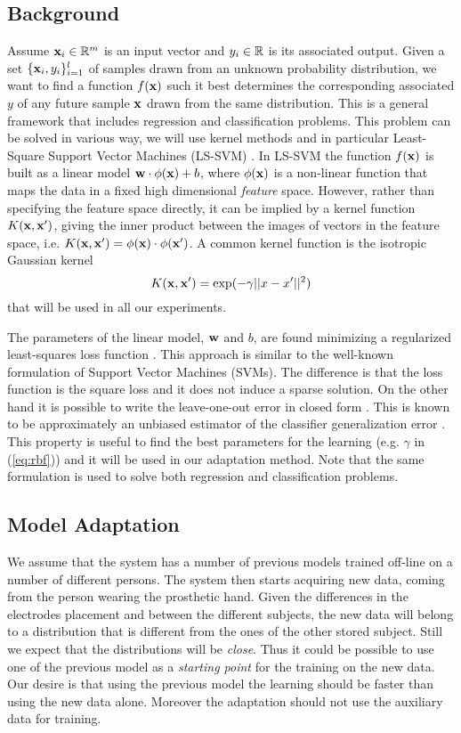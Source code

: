 \subsection{Background}

Assume $\mathbf{x}_i \in \mathbb{R}^m$ is an input vector and $y_i \in \mathbb{R}$ is its associated output.
Given a set $\{\mathbf{x}_i,y_i\}_{i=1}^l$ of samples drawn from an unknown probability
distribution, we want to find a function $f(\mathbf{x})$ such it
best determines the corresponding associated $y$ of any future sample $\mathbf{x}$
drawn from the same distribution.
This is a general framework that includes regression and classification problems.
This problem can be solved in various way, we will use kernel methods and in
particular Least-Square Support Vector Machines (LS-SVM) \cite{Cristianini00}.
In LS-SVM the function $f(\mathbf{x})$ is built as a linear model
$\mathbf{w} \cdot \phi(\mathbf{x}) + b$, where $\phi(\mathbf{x})$ is a non-linear function that maps
the data in a fixed high dimensional \emph{feature} space.
However, rather than specifying the feature space directly,
it can be implied by a kernel function $K(\mathbf{x},\mathbf{x}')$, giving the
inner product between the images of vectors in the feature
space, i.e. $K(\mathbf{x},\mathbf{x}')=\phi(\mathbf{x}) \cdot \phi(\mathbf{x}')$.
A common kernel function is the isotropic Gaussian kernel
\begin{equation}
	K(\xx,\xx')=\exp(-\gamma ||x-x'||^2)
	\label{eq:rbf}
\end{equation}
that will be used in all our experiments.

The parameters of the linear model, $\mathbf{w}$ and $b$, are found minimizing a
regularized least-squares loss function \cite{Cristianini00}.
This approach is similar to the well-known formulation of Support Vector
Machines (SVMs). The difference is that the loss function is the square loss and it
does not induce a sparse solution. On the other hand it is possible to write
the leave-one-out error in closed form \cite{Rifkin07}. This is known to be
approximately an unbiased estimator of the classifier generalization error
\cite{LuntzB69}. This property is useful to find the best parameters for the
learning (e.g. $\gamma$ in (\ref{eq:rbf})) and it will be used in our
adaptation method. Note that the same formulation is used to solve both
regression and classification problems.

\subsection{Model Adaptation}

We assume that the system has a number of previous models trained off-line on a
number of different persons. The system then starts acquiring new data, coming
from the person wearing the prosthetic hand. Given the differences in the
electrodes placement and between the different subjects, the new data will
belong to a distribution that is different from the ones of the other stored
subject. Still we expect that the distributions will be \emph{close}. Thus
it could be possible to use one of the previous model as a
\emph{starting point} for the training on the new data.
Our desire is that using the previous model the learning should be faster
than using the new data alone. Moreover the adaptation should not use the
auxiliary data for training.

